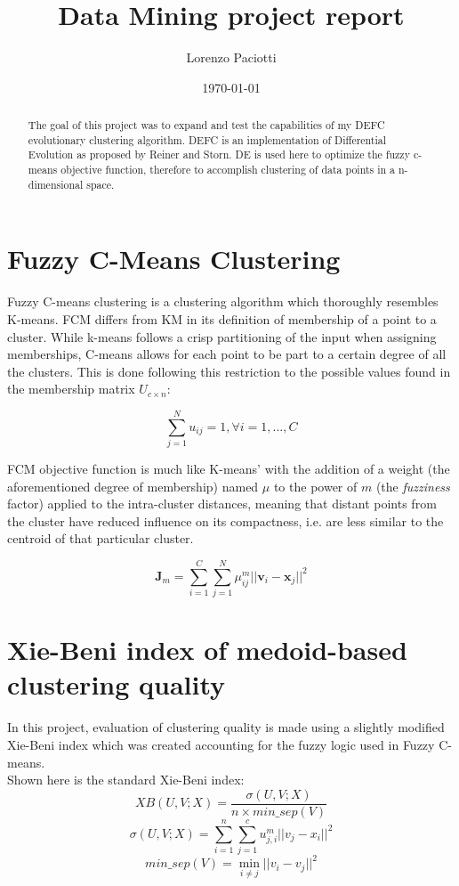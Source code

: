 \documentclass[a4paper]{article}
\title{Data Mining project report}
\author{Lorenzo Paciotti}
\date{\today}
\begin{document}
\maketitle

\begin{abstract}
The goal of this project was to expand and test the capabilities of my DEFC evolutionary clustering algorithm. DEFC is an implementation of Differential Evolution as proposed by Reiner and Storn. DE is used here to optimize the fuzzy c-means objective function, therefore to accomplish clustering of data points in a n-dimensional space.
\end{abstract}

\section{Fuzzy C-Means Clustering}

Fuzzy C-means clustering is a clustering algorithm which thoroughly resembles K-means. FCM differs from KM in its definition of membership of a point to a cluster. While k-means follows a crisp partitioning of the input when assigning memberships, C-means allows for each point to be part to a certain degree of all the clusters. This is done following this restriction to the possible values found in the membership matrix $U_{c\times n}$: 

$$\sum_{j=1}^{N} u_{ij} = 1, \forall i=1,...,C $$

FCM objective function is much like K-means' with the addition of a weight (the aforementioned degree of membership) named $\mu$ to the power of $m$ (the \textit{fuzziness} factor) applied to the intra-cluster distances, meaning that distant points from the cluster have reduced influence on its compactness, i.e. are less similar to the centroid of that particular cluster.

$$\textbf{J}_m = \sum_{i=1}^{C}\sum_{j=1}^{N}\mu_{ij}^m \lvert\lvert \textbf{v}_i - \textbf{x}_j \rvert\rvert^2$$

\section{Xie-Beni index of medoid-based clustering quality}
In this project, evaluation of clustering quality is made using a slightly modified Xie-Beni index which was created accounting for the fuzzy logic used in Fuzzy C-means.\\
Shown here is the standard Xie-Beni index:
$$XB(U,V;X)=\frac{\sigma(U,V;X)}{n \times min\_sep(V)}$$
$$\sigma(U,V;X) = \sum_{i=1}^{n}\sum_{j=1}^{c}u_{j,i}^m\lvert\lvert v_j - x_i \rvert\rvert^2$$
$$min\_sep(V) = \min_{i \not= j}\lvert\lvert v_i - v_j \rvert\rvert^2$$
\end{document}
